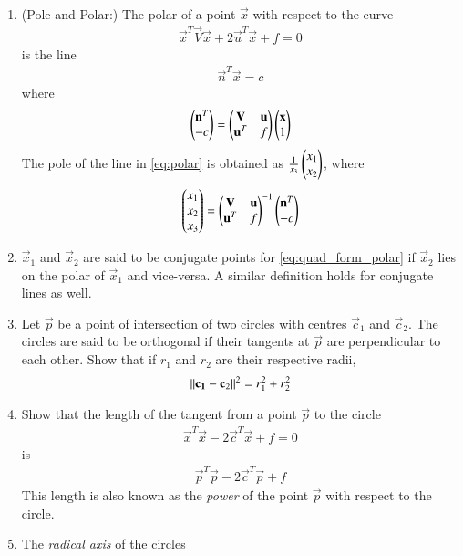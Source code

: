 \begin{enumerate}[label=\arabic*.,ref=\thesubsection.\theenumi]
\item (Pole and Polar:) The polar of a point $\vec{x}$ with respect to the curve
\begin{align}
\label{eq:quad_form_polar}
\vec{x}^T\vec{V}\vec{x}+2\vec{u}^T\vec{x}+f=0
\end{align}
is the line
\begin{align}
\label{eq:polar}
\vec{n}^T\vec{x} = c
\end{align}
%
where
\begin{align}
\begin{pmatrix}\mathbf{n}^T\\ - c\end{pmatrix}=
\begin{pmatrix}
\mathbf{V}&\mathbf{u}
\\
\mathbf{u}^T&f
\end{pmatrix}
\begin{pmatrix}\mathbf{x}\\1\end{pmatrix}
\end{align}
%
The pole of the line  in \eqref{eq:polar} is obtained as $\frac{1}{x_3}\begin{pmatrix}x_1\\x_2\end{pmatrix}$, where
\begin{align}
\begin{pmatrix}x_1 \\ x_2\\x_3\end{pmatrix}
=\begin{pmatrix}
\mathbf{V}&\mathbf{u}
\\
\mathbf{u}^T&f
\end{pmatrix}^{-1}
\begin{pmatrix}\mathbf{n}^T\\ - c\end{pmatrix}
\end{align}
\item $\vec{x}_1$ and $\vec{x}_2$ are said to be conjugate points for \eqref{eq:quad_form_polar} if $\vec{x}_2$ lies on the polar of $\vec{x}_1$ and vice-versa.  A similar definition holds for conjugate lines as well.
\item Let $\vec{p}$ be a point of intersection of two circles with centres $\vec{c}_1$ and $\vec{c}_2$.  The circles are said to be orthogonal if their tangents at $\vec{p}$ are perpendicular to each other.  Show that if $r_1$ and $r_2$ are their respective radii, 
\begin{align}
\label{eq:circ_orth}
\left\lVert\mathbf{c_1}-\mathbf{c}_2\right\rVert^2 = r_1^2+r_2^2 
\end{align}
\item Show that the length of the tangent from a point $\vec{p}$ to the circle 
\begin{align}
\label{eq:circ_quad_len}
\vec{x}^T\vec{x}-2\vec{c}^T\vec{x} + f = 0
\end{align}
%
is 
\begin{align}
\label{eq:circ_tang_len}
\vec{p}^T\vec{p}-2\vec{c}^T\vec{p} + f 
\end{align}
This length is also known as the {\em power} of the point $\vec{p}$ with respect to the circle.
\item  The {\em radical axis} of the circles 

\end{enumerate}
